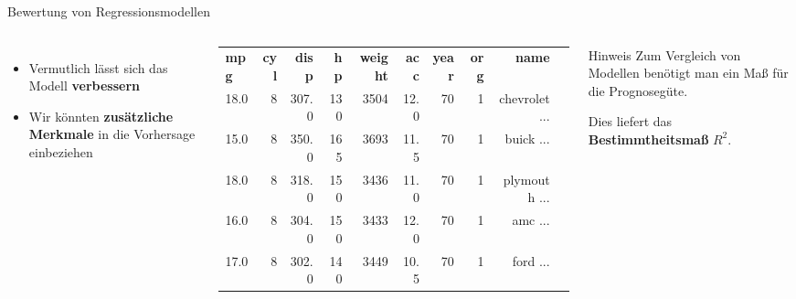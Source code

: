 \begin{frame}{Bewertung von Regressionsmodellen}
    
\begin{columns}
\begin{itemize}
    \item Vermutlich lässt sich das Modell \textbf{verbessern}
    \item Wir könnten \textbf{zusätzliche Merkmale} in die Vorhersage einbeziehen
\end{itemize}

\vspace{0.4em}

\scriptsize
\begin{tabular}{lrrrrrrrrl}
\textbf{mpg} & \textbf{cyl} & \textbf{disp} & \textbf{hp} & \textbf{weight} & \textbf{acc} & \textbf{year} & \textbf{org} & \textbf{name}\\
18.0 & 8 & 307.0 & 130 & 3504 & 12.0 & 70 & 1 & chevrolet ...  \\
15.0 & 8 & 350.0 & 165 & 3693 & 11.5 & 70 & 1 & buick ... \\
18.0 & 8 & 318.0 & 150 & 3436 & 11.0 & 70 & 1 & plymouth ... \\
16.0 & 8 & 304.0 & 150 & 3433 & 12.0 & 70 & 1 & amc ... \\
17.0 & 8 & 302.0 & 140 & 3449 & 10.5 & 70 & 1 & ford ... \\
\end{tabular}

\begin{block}{Hinweis}
Zum Vergleich von Modellen benötigt man ein Maß für die Prognosegüte.

Dies liefert das \textbf{Bestimmtheitsmaß} $R^2$.
\end{block}
\end{columns}
\end{frame}

